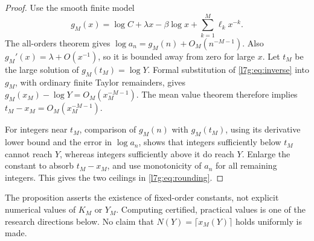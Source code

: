 \documentclass[11pt,letterpaper]{article}
\theoremstyle{remark}\newtheorem{remark}[theorem]{Remark}
\newcounter{l7gtrsavedeq}
\begin{document}
\begin{proof}
Use the smooth finite model
\[
 g_M(x)=\log C+\lambda x-\beta\log x+
                      \sum_{k=1}^{M}\ell_kx^{-k}.
\]
The all-orders theorem gives
$\log a_n=g_M(n)+O_M(n^{-M-1})$. Also
$g_M'(x)=\lambda+O(x^{-1})$, so it is bounded away from zero for large
$x$. Let $t_M$ be the large solution of $g_M(t_M)=\log Y$.
Formal substitution of \eqref{l7g:eq:inverse} into $g_M$, with ordinary
finite Taylor remainders, gives
$g_M(x_M)-\log Y=O_M(x_M^{-M-1})$. The mean value theorem therefore
implies $t_M-x_M=O_M(x_M^{-M-1})$.

For integers near $t_M$, comparison of $g_M(n)$ with $g_M(t_M)$,
using its derivative lower bound and the error in $\log a_n$, shows
that integers sufficiently below $t_M$ cannot reach $Y$, whereas
integers sufficiently above it do reach $Y$. Enlarge the constant to
absorb $t_M-x_M$, and use monotonicity of $a_n$ for all remaining
integers. This gives the two ceilings in \eqref{l7g:eq:rounding}.
\end{proof}

The proposition asserts the existence of fixed-order constants, not
explicit numerical values of $K_M$ or $Y_M$. Computing certified,
practical values is one of the research directions below. No claim
that $N(Y)=\lceil x_M(Y)\rceil$ holds uniformly is made.
\end{document}
